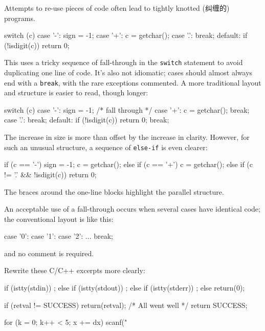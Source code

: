 Attempts to re-use pieces of code often lead to tightly knotted (纠缠的) programs.
\begin{badcode}
    switch (c) {
    case '-': sign = -1;
    case '+': c = getchar();
    case '.': break;
    default: if (!isdigit(c))
                return 0;
    }
\end{badcode}
This uses a tricky sequence of fall-through in the \verb'switch' statement
to avoid duplicating one line of code. It's also not idiomatic; cases
should almost always end with a \verb'break', with the rare exceptions
commented. A more traditional layout and structure is easier to read,
though longer:
\begin{badcode}
    switch (c) {
    case '-':
        sign = -1;
        /* fall through */
    case '+':
        c = getchar();
        break;
    case '.':
        break;
    default:
        if (!isdigit(c))
            return 0;
        break;
    }
\end{badcode}
The increase in size is more than offset by the increase in clarity.
However, for such an unusual structure, a sequence of \verb'else-if' is
even clearer:
\begin{wellcode}
    if (c == '-') {
        sign = -1;
        c = getchar();
    } else if (c == '+') {
        c = getchar();
    } else if (c != '.' && !isdigit(c)) {
        return 0;
    }
\end{wellcode}
The braces around the one-line blocks highlight the parallel structure.

An acceptable use of a fall-through occurs when several cases have
identical code; the conventional layout is like this:
\begin{wellcode}
    case '0':
    case '1':
    case '2':
        ...
        break;
\end{wellcode}
and no comment is required.

\begin{exercise}
    Rewrite these C/C++ excerpts more clearly:

    \begin{badcode}
        if (istty(stdin)) ;
        else if (istty(stdout)) ;
            else if (istty(stderr)) ;
                else return(0);
    \end{badcode}

    \begin{badcode}
        if (retval != SUCCESS)
            return(retval);
        /* All went well */
        return SUCCESS;
    \end{badcode}

    \begin{badcode}
        for (k = 0; k++ < 5; x += dx)
            scanf("%
    \end{badcode}
\end{exercise}

